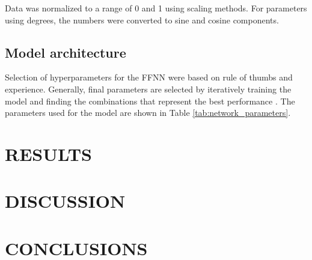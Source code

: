 \documentclass[10pt,a4paper,twocolumn]{article}
\begin{document}
Data was normalized to a range of 0 and 1 using scaling methods. For parameters using degrees, the numbers were converted to sine and cosine components. 

\subsection{Model architecture}
Selection of hyperparameters for the FFNN were based on rule of thumbs and experience. Generally, final parameters are selected by iteratively training the model and finding the combinations that represent the best performance \cite{Freeman2018}. The parameters used for the model are shown in Table \ref{tab:network_parameters}.

\begin{table}[]
\centering
\caption{Network hyperparameters used to build the feed forward neural network}
\label{tab:network_parameters}
\end{table}


\section{RESULTS}

\section{DISCUSSION}




\section{CONCLUSIONS}
\end{document}
